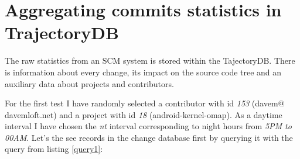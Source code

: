 \documentclass[a4paper,10pt]{article}
\numberwithin{equation}{subsection}
\begin{document}
\section{Aggregating commits statistics in TrajectoryDB}\label{sec:first}
The raw statistics from an SCM system is stored within the TajectoryDB. There is information about every change, its impact
on the source code tree and an auxiliary data about projects and contributors.

For the first test I have randomly selected a contributor with id \emph{153} (davem$@$davemloft.net) and a project with id 
\emph{18} (android-kernel-omap). 
As a daytime interval I have chosen the \emph{nt} interval corresponding to night hours from \emph{5PM to 00AM}. 
Let's the see records in the change database first by querying it with the query from listing \ref{query1}:
\end{document}
